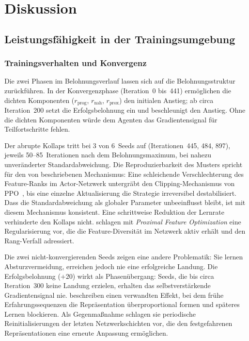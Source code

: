 \chapter{Diskussion}
\label{cha:Diskussion}

\section{Leistungsfähigkeit in der Trainingsumgebung}
\label{sec:disk_nf1}

\subsection{Trainingsverhalten und Konvergenz}

Die zwei Phasen im Belohnungsverlauf lassen sich auf die
Belohnungsstruktur zurückführen. In der Konvergenzphase (Iteration~0
bis~441) ermöglichen die dichten Komponenten ($r_{\mathrm{prog}}$,
$r_{\mathrm{nah}}$, $r_{\mathrm{prox}}$) den initialen Anstieg; ab circa
Iteration~200 setzt die Erfolgsbelohnung ein und beschleunigt den
Anstieg. Ohne die dichten Komponenten würde dem Agenten das
Gradientensignal für Teilfortschritte fehlen.

Der abrupte Kollaps tritt bei 3 von 6~Seeds auf (Iterationen~445, 484,
897), jeweils 50--85~Iterationen nach dem Belohnungsmaximum, bei nahezu
unveränderter Standardabweichung. Die Reproduzierbarkeit des Musters
spricht für den von \textcite{moallaNoRepresentationNo} beschriebenen
Mechanismus: Eine schleichende Verschlechterung des Feature-Ranks im
Actor-Netzwerk untergräbt den Clipping-Mechanismus von
PPO~\autocite{schulmanProximalPolicyOptimization2017}, bis eine einzelne
Aktualisierung die Strategie irreversibel destabilisiert. Dass die
Standardabweichung als globaler Parameter unbeeinflusst bleibt, ist mit
diesem Mechanismus konsistent. Eine schrittweise Reduktion der Lernrate
verhinderte den Kollaps nicht.
\textcite{moallaNoRepresentationNo} schlagen mit \textit{Proximal Feature
Optimization} eine Regularisierung vor, die die Feature-Diversität im
Netzwerk aktiv erhält und den Rang-Verfall adressiert.

Die zwei nicht-konvergierenden Seeds zeigen eine andere Problematik:
Sie lernen Absturzvermeidung, erreichen jedoch nie eine erfolgreiche
Landung. Die Erfolgsbelohnung ($+20$) wirkt als Phasenübergang: Seeds,
die bis circa Iteration~300 keine Landung erzielen, erhalten das
selbstverstärkende Gradientensignal nie.
\textcite{nikishinPrimacyBiasDeep2022} beschreiben einen verwandten
Effekt, bei dem frühe Erfahrungssequenzen die Repräsentation
überproportional formen und späteres Lernen blockieren. Als
Gegenmaßnahme schlagen sie periodische Reinitialisierungen der letzten
Netzwerkschichten vor, die den festgefahrenen Repräsentationen eine
erneute Anpassung ermöglichen.

